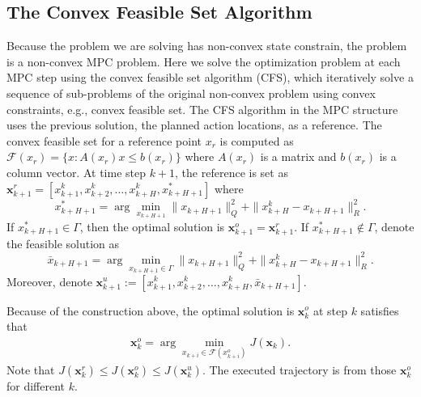 \documentclass{ifacconf}
\begin{document}
\subsection{The Convex Feasible Set Algorithm}
Because the problem we are solving has non-convex state constrain, the problem is a non-convex MPC problem. Here we solve the optimization problem at each MPC step using the convex feasible set algorithm (CFS), which iteratively solve a sequence of sub-problems of the original non-convex problem using convex constraints, e.g., convex feasible set. The CFS algorithm in the MPC structure uses the previous solution, the planned action locations, as a reference. The convex feasible set for a reference point $x_r$ is computed as $\mathcal{F}(x_r) = \{x:A(x_r)x\leq b(x_r)\}$ where $A(x_r)$ is a matrix and $b(x_r)$ is a column vector. 
At time step $k+1$, the reference is set as $\mathbf{x}_{k+1}^{r}=[x_{k+1}^{k},x_{k+2}^{k},\ldots,x_{k+H}^k, x_{k+H+1}^*]$ where
\begin{equation}
x_{k+H+1}^* = \arg\min_{x_{k+H+1}} \|x_{k+H+1}\|_Q^2+\|x_{k+H}^k-x_{k+H+1}\|_R^2\text{.}
\end{equation}
If $x_{k+H+1}^*\in\Gamma$, then the optimal solution is $\mathbf{x}_{k+1}^o = \mathbf{x}_{k+1}^r$.  If $x_{k+H+1}^*\notin\Gamma$, denote the feasible solution as 
\begin{equation}
\bar{x}_{k+H+1} = \arg\min_{x_{k+H+1}\in\Gamma} \|x_{k+H+1}\|_Q^2
+\|x_{k+H}^k-x_{k+H+1}\|_R^2\text{.}
\end{equation}
Moreover, denote $\mathbf{x}_{k+1}^{u}:=[x_{k+1}^{k},x_{k+2}^{k},\ldots,x_{k+H}^k, \bar x_{k+H+1}]$. 

Because of the construction above, the optimal solution is $\mathbf{x}_k^{o}$ at step $k$ satisfies that
\begin{eqnarray}
\mathbf{x}_k^{o} = \arg\min_{x_{k+i}\in \mathcal{F}(x_{k+i}^o)}J(\mathbf{x}_k).
\end{eqnarray}
Note that $J(\mathbf{x}_k^{r})\leq J(\mathbf{x}_k^{o})\leq J(\mathbf{x}_k^{u})$. 
The executed trajectory is from those $\mathbf{x}_k^{o}$ for different $k$.
\end{document}
